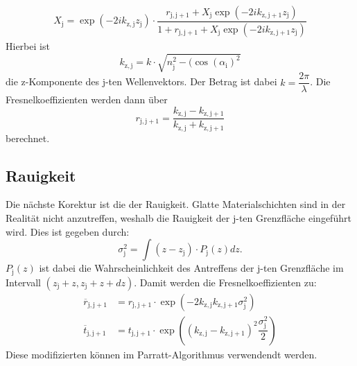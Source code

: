 \begin{align}
  \label{eqn:Parrat-Algorithmus}
X_\mathrm{j}= \exp(-2i k_\mathrm{z,j}z_\mathrm{j})\cdot\dfrac{r_\mathrm{j,j+1}+X_\mathrm{j}\exp(-2i k_\mathrm{z,j+1}z_\mathrm{j})}{1+r_\mathrm{j,j+1}+X_\mathrm{j}\exp(-2i k_\mathrm{z,j+1}z_\mathrm{j})}
\end{align}
Hierbei ist
\begin{equation}
  \label{eqn:kzj}
 k_\mathrm{z,j}= k\cdot\sqrt{n_\mathrm{j}^2-(\cos(\alpha_\mathrm{i})^2}
\end{equation}
die z-Komponente des j-ten Wellenvektors. Der Betrag ist dabei $k=\dfrac{2\pi}{\lambda}$. Die Fresnelkoeffizienten werden dann über
\begin{equation}
  \label{eqn:Veränderten Fresnelkoefizienten}
  r_\mathrm{j,j+1}= \dfrac{k_\mathrm{z,j}-k_\mathrm{z,j+1}}{ k_\mathrm{z,j}+ k_\mathrm{z,j+1}}
\end{equation}
berechnet.
\subsection{Rauigkeit}
\label{sec:Rauigkeit}
Die nächste Korektur ist die der Rauigkeit. Glatte Materialschichten sind in der Realität nicht anzutreffen, weshalb die Rauigkeit der j-ten Grenzfläche eingeführt wird. Dies ist gegeben durch:
\begin{equation}
  \label{eqn:rms}
\sigma_\mathrm{j}^2= \int (z-z_\mathrm{j})\cdot P_\mathrm{j}(z) dz.
\end{equation}
$P_\mathrm{j}(z)$ ist dabei die Wahrscheinlichkeit des Antreffens der j-ten Grenzfläche im Intervall $(z_\mathrm{j}+z,z_\mathrm{j}+z+dz)$.
Damit werden die Fresnelkoeffizienten zu:
\begin{align}
  \label{eqn:modkoeff}
  \overline{r}_\mathrm{j,j+1}&=r_\mathrm{j,j+1}\cdot\exp(-2 k_\mathrm{z,j} k_\mathrm{z,j+1}\sigma_\mathrm{j}^2) \\
  \label{eqn:modkoeff2}
  \overline{t}_\mathrm{j,j+1}&=t_\mathrm{j,j+1}\cdot\exp\left(( k_\mathrm{z,j}-k_\mathrm{z,j+1})^2 \dfrac{\sigma_\mathrm{j}^2}{2}\right)
\end{align}
Diese modifizierten können im Parratt-Algorithmus verwendendt werden.
